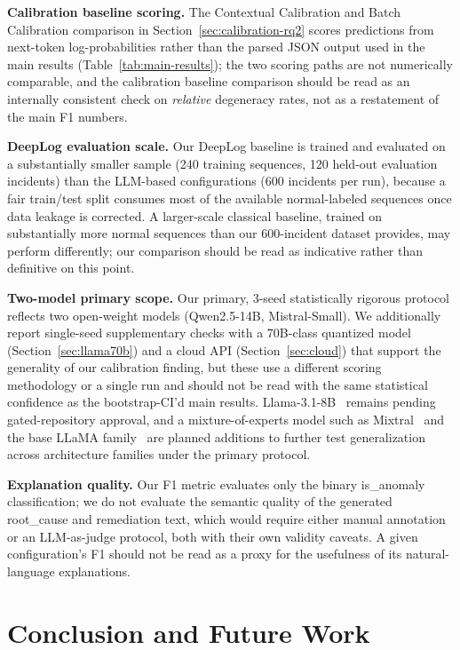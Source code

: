 \documentclass[10pt,conference]{IEEEtran}
\begin{document}
\textbf{Calibration baseline scoring.} The Contextual Calibration and
Batch Calibration comparison in Section~\ref{sec:calibration-rq2} scores
predictions from next-token log-probabilities rather than the parsed
JSON output used in the main results (Table~\ref{tab:main-results}); the
two scoring paths are not numerically comparable, and the calibration
baseline comparison should be read as an internally consistent check on
\emph{relative} degeneracy rates, not as a restatement of the main F1
numbers.

\textbf{DeepLog evaluation scale.} Our DeepLog baseline is trained and
evaluated on a substantially smaller sample (240 training sequences, 120
held-out evaluation incidents) than the LLM-based configurations (600
incidents per run), because a fair train/test split consumes most of the
available normal-labeled sequences once data leakage is corrected. A
larger-scale classical baseline, trained on substantially more normal
sequences than our 600-incident dataset provides, may perform
differently; our comparison should be read as indicative rather than
definitive on this point.

\textbf{Two-model primary scope.} Our primary, 3-seed statistically
rigorous protocol reflects two open-weight models (Qwen2.5-14B,
Mistral-Small). We additionally report single-seed supplementary checks
with a 70B-class quantized model (Section~\ref{sec:llama70b}) and a
cloud API (Section~\ref{sec:cloud}) that support the generality of our
calibration finding, but these use a different scoring methodology or a
single run and should not be read with the same statistical confidence
as the bootstrap-CI'd main results. Llama-3.1-8B~\cite{touvron2023llama2}
remains pending gated-repository approval, and a mixture-of-experts model
such as Mixtral~\cite{jiang2024mixtral} and the base LLaMA
family~\cite{touvron2023llama} are planned additions to further test
generalization across architecture families under the primary protocol.

\textbf{Explanation quality.} Our F1 metric evaluates only the binary
is\_anomaly classification; we do not evaluate the semantic quality of the
generated root\_cause and remediation text, which would require either
manual annotation or an LLM-as-judge protocol, both with their own
validity caveats. A given configuration's F1 should not be read as a
proxy for the usefulness of its natural-language explanations.

\section{Conclusion and Future Work}
\end{document}
